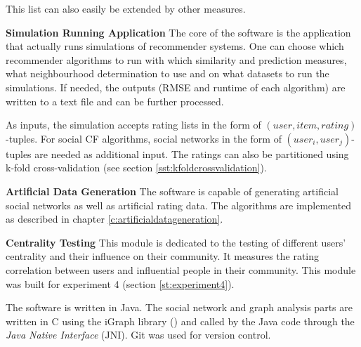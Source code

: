 This list can also easily be extended by other measures.
\newline

\textbf{Simulation Running Application} The core of the software is the application that actually runs simulations of recommender systems. One can choose which recommender algorithms to run with which similarity and prediction measures, what neighbourhood determination to use and on what datasets to run the simulations. If needed, the outputs (RMSE and runtime of each algorithm) are written to a text file and can be further processed.

As inputs, the simulation accepts rating lists in the form of $(user,item,rating)$-tuples. For social CF algorithms, social networks in the form of $(user_i,user_j)$-tuples are needed as additional input. The ratings can also be partitioned using k-fold cross-validation (see section \ref{sst:kfoldcrossvalidation}).
\newline

\textbf{Artificial Data Generation} The software is capable of generating artificial social networks as well as artificial rating data. The algorithms are implemented as described in chapter \ref{c:artificialdatageneration}.
\newline

\textbf{Centrality Testing} This module is dedicated to the testing of different users' centrality and their influence on their community. It measures the rating correlation between users and influential people in their community. This module was built for experiment 4 (section \ref{st:experiment4}).
\newline

The software is written in Java. The social network and graph analysis parts are written in C using the iGraph library (\cite{Igraph}) and called by the Java code through the \textit{Java Native Interface} (JNI). Git was used for version control.